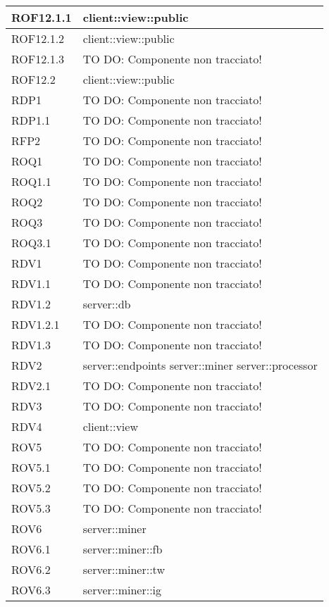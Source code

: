 \begin{center}
\begin{longtable}{| p{4cm} | p{8cm} |}
\hline
ROF12.1.1 & client::view::public \\
\hline
ROF12.1.2 & client::view::public \\
\hline
ROF12.1.3 & TO DO: Componente non tracciato! \\
\hline
ROF12.2 & client::view::public \\
\hline
RDP1 & TO DO: Componente non tracciato! \\
\hline
RDP1.1 & TO DO: Componente non tracciato! \\
\hline
RFP2 & TO DO: Componente non tracciato! \\
\hline
ROQ1 & TO DO: Componente non tracciato! \\
\hline
ROQ1.1 & TO DO: Componente non tracciato! \\
\hline
ROQ2 & TO DO: Componente non tracciato! \\
\hline
ROQ3 & TO DO: Componente non tracciato! \\
\hline
ROQ3.1 & TO DO: Componente non tracciato! \\
\hline
RDV1 & TO DO: Componente non tracciato! \\
\hline
RDV1.1 & TO DO: Componente non tracciato! \\
\hline
RDV1.2 & server::db \\
\hline
RDV1.2.1 & TO DO: Componente non tracciato! \\
\hline
RDV1.3 & TO DO: Componente non tracciato! \\
\hline
RDV2 & server::endpoints \newline server::miner \newline server::processor \\
\hline
RDV2.1 & TO DO: Componente non tracciato! \\
\hline
RDV3 & TO DO: Componente non tracciato! \\
\hline
RDV4 & client::view \\
\hline
ROV5 & TO DO: Componente non tracciato! \\
\hline
ROV5.1 & TO DO: Componente non tracciato! \\
\hline
ROV5.2 & TO DO: Componente non tracciato! \\
\hline
ROV5.3 & TO DO: Componente non tracciato! \\
\hline
ROV6 & server::miner \\
\hline
ROV6.1 & server::miner::fb \\
\hline
ROV6.2 & server::miner::tw \\
\hline
ROV6.3 & server::miner::ig \\

\end{longtable}
\end{center}
